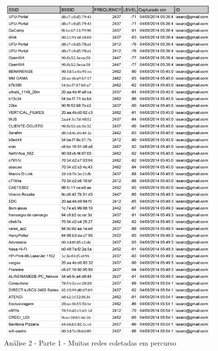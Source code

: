 \documentclass[12pt, %
openright, 
oneside,
a4paper,
brazil]{facom-ufu-abntex2}
\begin{document}
\begin{figure}[hbt]
  \includegraphics[scale=0.8]{analise201}
  \caption{Análise 2 - Parte 1 - Muitas redes coletadas em percurso}
\end{figure}
\end{document}
